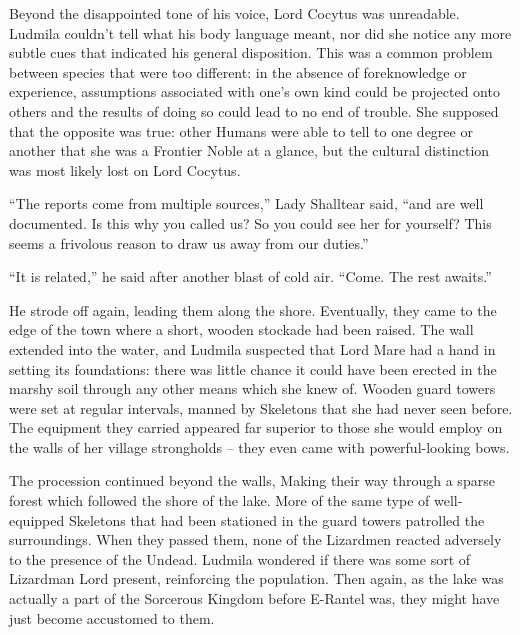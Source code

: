  

Beyond the disappointed tone of his voice, Lord Cocytus was unreadable. Ludmila couldn’t tell what his body language meant, nor did she notice any more subtle cues that indicated his general disposition. This was a common problem between species that were too different: in the absence of foreknowledge or experience, assumptions associated with one’s own kind could be projected onto others and the results of doing so could lead to no end of trouble. She supposed that the opposite was true: other Humans were able to tell to one degree or another that she was a Frontier Noble at a glance, but the cultural distinction was most likely lost on Lord Cocytus.

 

“The reports come from multiple sources,” Lady Shalltear said, “and are well documented. Is this why you called us? So you could see her for yourself? This seems a frivolous reason to draw us away from our duties.”

 

“It is related,” he said after another blast of cold air. “Come. The rest awaits.”

 

He strode off again, leading them along the shore. Eventually, they came to the edge of the town where a short, wooden stockade had been raised. The wall extended into the water, and Ludmila suspected that Lord Mare had a hand in setting its foundations: there was little chance it could have been erected in the marshy soil through any other means which she knew of. Wooden guard towers were set at regular intervals, manned by Skeletons that she had never seen before. The equipment they carried appeared far superior to those she would employ on the walls of her village strongholds – they even came with powerful-looking bows.

 

The procession continued beyond the walls, Making their way through a sparse forest which followed the shore of the lake. More of the same type of well-equipped Skeletons that had been stationed in the guard towers patrolled the surroundings. When they passed them, none of the Lizardmen reacted adversely to the presence of the Undead. Ludmila wondered if there was some sort of Lizardman Lord present, reinforcing the population. Then again, as the lake was actually a part of the Sorcerous Kingdom before E-Rantel was, they might have just become accustomed to them.

 

